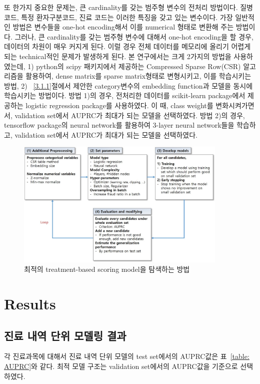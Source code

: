 \documentclass[11pt]{article}           %
\begin{document}
또 한가지 중요한 문제는, 큰 cardinality를 갖는 범주형 변수의 전처리 방법이다.
질병 코드, 특정 환자구분코드, 진료 코드는 이러한 특징을 갖고 있는 변수이다.
가장 일반적인 방법은 변수들을 one-hot encoding해서 이를 numerical 형태로 변환해 주는 방법이다.
그러나, 큰 cardinality를 갖는 범주형 변수에 대해서 one-hot encoding을 할 경우, 데이터의 차원이 매우 커지게 된다.
이럴 경우 전체 데이터를 메모리에 올리기 어렵게 되는 technical적인 문제가 발생하게 된다.
본 연구에서는 크게 2가지의 방법을 사용하였는데, 1) python의 scipy 패키지에서 제공하는 Compressed Sparse Row(CSR) 알고리즘을 활용하여, dense matrix를 sparse matrix형태로 변형시키고, 이를 학습시키는 방법, 2) ~\ref{3.1.1}절에서 제안한 category변수의 embedding function과 모델을 동시에 학습시키는 방법이다.
방법 1)의 경우, 전처리한 데이터를 scikit-learn package에서 제공하는 logistic regression package를 사용하였다.
이 때, class weight를 변화시켜가면서, validation set에서 AUPRC가 최대가 되는 모델을 선택하였다.
방법 2)의 경우, tensorflow package의 neural network를 활용하여 3-layer neural network들을 학습하고, validation set에서 AUPRC가 최대가 되는 모델을 선택하였다.

\begin{figure}[h]
   \centering
   \vspace{0.5cm}
   \includegraphics[width=0.9\textwidth]{[figure8]treatment-based_modeling.jpg}
   \vspace{-0.5cm}
   \caption{최적의 treatment-based scoring model을 탐색하는 방법}
   \vspace{0.5cm}
   \label{fig:treatment-based modeling}
\end{figure}

\section{Results}
\label{5}
\subsection{진료 내역 단위 모델링 결과}
\label{5.1}
각 진료과목에 대해서 진료 내역 단위 모델의 test set에서의 AUPRC값은 표~\ref{table: AUPRC}와 같다.
최적 모델 구조는 validation set에서의 AUPRC값을 기준으로 선택하였다.
\end{document}
